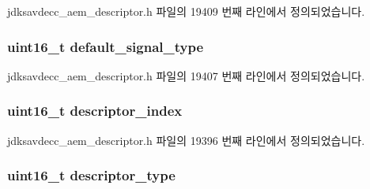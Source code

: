 jdksavdecc\+\_\+aem\+\_\+descriptor.\+h 파일의 19409 번째 라인에서 정의되었습니다.

\subsubsection[{\texorpdfstring{default\+\_\+signal\+\_\+type}{default_signal_type}}]{\setlength{\rightskip}{0pt plus 5cm}uint16\+\_\+t default\+\_\+signal\+\_\+type}\hypertarget{structjdksavdecc__descriptor__signal__selector_a18ece2e97b4c992cddf6d79fea5de625}{}\label{structjdksavdecc__descriptor__signal__selector_a18ece2e97b4c992cddf6d79fea5de625}


jdksavdecc\+\_\+aem\+\_\+descriptor.\+h 파일의 19407 번째 라인에서 정의되었습니다.

\subsubsection[{\texorpdfstring{descriptor\+\_\+index}{descriptor_index}}]{\setlength{\rightskip}{0pt plus 5cm}uint16\+\_\+t descriptor\+\_\+index}\hypertarget{structjdksavdecc__descriptor__signal__selector_a042bbc76d835b82d27c1932431ee38d4}{}\label{structjdksavdecc__descriptor__signal__selector_a042bbc76d835b82d27c1932431ee38d4}


jdksavdecc\+\_\+aem\+\_\+descriptor.\+h 파일의 19396 번째 라인에서 정의되었습니다.

\subsubsection[{\texorpdfstring{descriptor\+\_\+type}{descriptor_type}}]{\setlength{\rightskip}{0pt plus 5cm}uint16\+\_\+t descriptor\+\_\+type}\hypertarget{structjdksavdecc__descriptor__signal__selector_ab7c32b6c7131c13d4ea3b7ee2f09b78d}{}\label{structjdksavdecc__descriptor__signal__selector_ab7c32b6c7131c13d4ea3b7ee2f09b78d}


